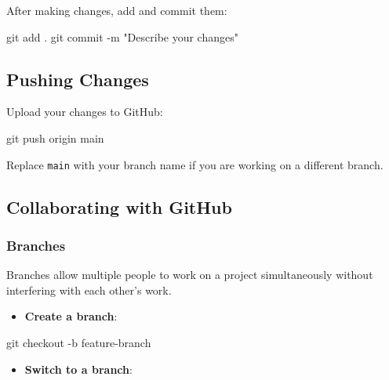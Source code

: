 \documentclass[
  letterpaper,
  DIV=11,
  numbers=noendperiod]{scrreprt}
\newenvironment{Shaded}{\begin{snugshade}}{\end{snugshade}}
\newcommand{\AttributeTok}[1]{\textcolor[rgb]{0.40,0.45,0.13}{#1}}
\newcommand{\FunctionTok}[1]{\textcolor[rgb]{0.28,0.35,0.67}{#1}}
\newcommand{\NormalTok}[1]{\textcolor[rgb]{0.00,0.23,0.31}{#1}}
\newcommand{\StringTok}[1]{\textcolor[rgb]{0.13,0.47,0.30}{#1}}
\providecommand{\tightlist}{%
  \setlength{\itemsep}{0pt}\setlength{\parskip}{0pt}}\usepackage{longtable,booktabs,array}
\begin{document}
After making changes, add and commit them:

\begin{Shaded}
\begin{Highlighting}[]
\FunctionTok{git}\NormalTok{ add .}
\FunctionTok{git}\NormalTok{ commit }\AttributeTok{{-}m} \StringTok{"Describe your changes"}
\end{Highlighting}
\end{Shaded}

\subsection{Pushing Changes}\label{pushing-changes-1}

Upload your changes to GitHub:

\begin{Shaded}
\begin{Highlighting}[]
\FunctionTok{git}\NormalTok{ push origin main}
\end{Highlighting}
\end{Shaded}

Replace \texttt{main} with your branch name if you are working on a
different branch.

\subsection{Collaborating with GitHub}\label{collaborating-with-github}

\subsubsection{Branches}\label{branches}

Branches allow multiple people to work on a project simultaneously
without interfering with each other's work.

\begin{itemize}
\tightlist
\item
  \textbf{Create a branch}:
\end{itemize}

\begin{Shaded}
\begin{Highlighting}[]
\FunctionTok{git}\NormalTok{ checkout }\AttributeTok{{-}b}\NormalTok{ feature{-}branch}
\end{Highlighting}
\end{Shaded}

\begin{itemize}
\tightlist
\item
  \textbf{Switch to a branch}:
\end{itemize}
\end{document}
